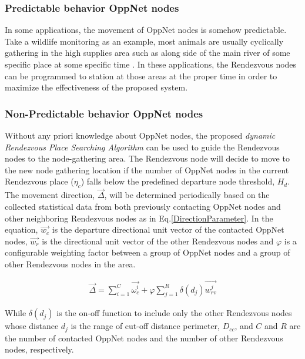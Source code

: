 \documentclass[conference]{IEEEtran}
\begin{document}
\subsubsection{Predictable behavior OppNet nodes}

In some applications, the movement of OppNet nodes is somehow predictable.
Take a wildlife monitoring as an example, most animals are usually cyclically gathering in the high supplies area such as along side of the main river of some specific place at some specific time \cite{Yu2007}.
%
In these applications, the Rendezvous nodes can be programmed to station at those areas at the proper time in order to maximize the effectiveness of the proposed system.

\subsubsection{Non-Predictable behavior OppNet nodes}

Without any priori knowledge about OppNet nodes, the proposed \emph{dynamic Rendezvous Place Searching Algorithm} can be used to guide the Rendezvous nodes to the node-gathering area.
%
The Rendezvous node will decide to move to the new node gathering location if the number of OppNet nodes in the current Rendezvous place ($\eta_{c}$) falls below the predefined departure node threshold, $H_{d}$.
%
The movement direction, $\vec{\Delta}$, will be determined periodically based on the collected statistical data from both previously contacting OppNet nodes and other neighboring Rendezvous nodes as in Eq.\ref{DirectionParameter}.
%
In the equation, $\vec{w_c}$ is the departure directional unit vector of the contacted OppNet nodes, $\vec{w_r}$ is the directional unit vector of the other Rendezvous nodes and $\varphi$ is a configurable weighting factor between a group of OppNet nodes and a group of other Rendezvous nodes in the area.

\begin{eqnarray}
\label{DirectionParameter}
\vec{\Delta} =\sum _{ i=1 }^{ C }{ \vec { { \omega }_{ c }^{ i } }  } + \varphi \sum _{ j=1 }^{ R }{ \delta\left( d_{j} \right)
	\vec { {w }_{ rv }^{ j } }  }
\end{eqnarray}

While $\delta\left( d_{j} \right)$ is the on-off function to include only the other Rendezvous nodes whose distance $d_j$ is the range of cut-off distance perimeter, $D_{cc}$, and $C$ and $R$ are the number of contacted OppNet nodes and the number of other Rendezvous nodes, respectively.
\end{document}
